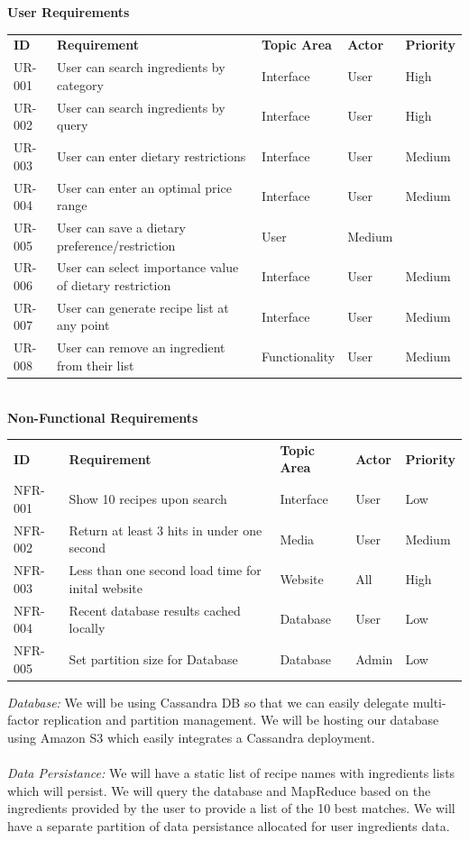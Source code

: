 \documentclass[12pt]{article}
\begin{document}
\begin{center}
 \textbf{User Requirements} \\
\begin{tabular}{ l  l  l  l  l  }
  \textbf{ID}  & \textbf{Requirement} & \textbf{Topic Area} & \textbf{Actor} & \textbf{Priority} \\  \rowcolor[gray]{.95}  \hline
  UR-001 & User can search ingredients by category & Interface & User & High \\  
  UR-002 & User can search ingredients by query & Interface & User & High \\  \rowcolor[gray]{.95}
  UR-003 & User can enter dietary restrictions & Interface & User & Medium \\  
  UR-004 & User can enter an optimal price range & Interface & User & Medium \\  \rowcolor[gray]{.95}
   UR-005 & User can save a dietary preference/restriction & User & Medium \\ 
  UR-006 & User can select importance value of dietary restriction & Interface & User & Medium \\ \rowcolor[gray]{.95}
  UR-007 & User can generate recipe list at any point & Interface & User & Medium \\
  UR-008 & User can remove an ingredient from their list & Functionality & User & Medium \\
\end{tabular}
\\
  \vspace{1cm}
  \textbf{Non-Functional Requirements}
\begin{tabular}{ l  l  l  l  l  }
  \hline
  \textbf{ID}  & \textbf{Requirement} & \textbf{Topic Area} & \textbf{Actor} & \textbf{Priority} \\  \rowcolor[gray]{.95}
  NFR-001 & Show 10 recipes upon search  &  Interface & User & Low  \\  
  NFR-002 & Return at least 3 hits in under one second & Media & User &  Medium\\  \rowcolor[gray]{.95}
  NFR-003 & Less than one second load time for inital website &  Website & All & High \\ 
  NFR-004 & Recent database results cached locally & Database & User & Low \\  \rowcolor[gray]{.95}
  NFR-005 & Set partition size for Database & Database & Admin & Low \\ 
\end{tabular}
\end{center}

\newpage
\textit{Database: } We will be using Cassandra DB so that we can easily delegate multi-factor replication and partition management. We will be hosting our database using
Amazon S3 which easily integrates a Cassandra deployment. \\
\vspace{1cm} \\
\textit{Data Persistance: } We will have a static list of recipe names with ingredients lists which will persist. We will query the database and MapReduce based on the ingredients
provided by the user to provide a list of the 10 best matches. We will have a separate partition of data persistance allocated for user ingredients data. 
\end{document}
